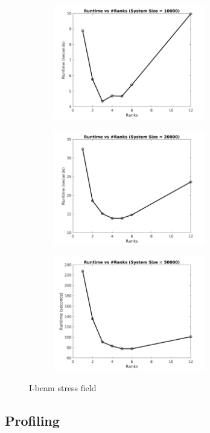 \documentclass[sigplan,screen]{acmart}
\begin{document}
\begin{figure}
\begin{subfigure}{0.4\textwidth}
		\caption{}
	\end{subfigure}
	\begin{subfigure}{0.4\textwidth}
		\includegraphics[trim= 20 5 35 10,clip, width=0.95\linewidth, height=5cm]{plots/MPI_strong_10k.png}
		\caption{}
	\end{subfigure}
	\begin{subfigure}{0.4\textwidth}
		\includegraphics[trim= 20 5 35 10,clip, width=0.95\linewidth, height=5cm]{plots/MPI_strong_20k.png} 
		\caption{}
	\end{subfigure}
	\begin{subfigure}{0.4\textwidth}
		\includegraphics[trim= 20 5 35 10,clip, width=0.95\linewidth, height=5cm]{plots/MPI_strong_50k.png}
		\caption{}
	\end{subfigure}
	\caption{I-beam stress field}
	\label{beam_stress}
\end{figure}
 
 
\subsection{Profiling}
\end{document}
